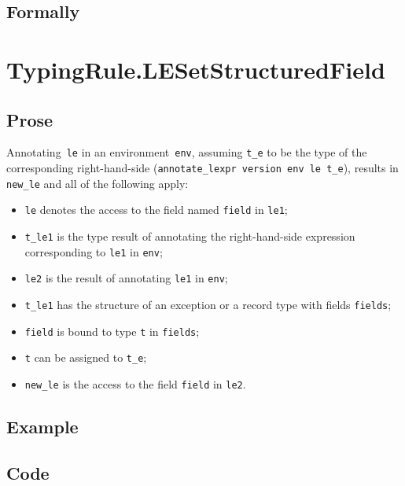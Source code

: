 \documentclass{book}
\begin{document}
\begin{emptyformal}
    \subsection{Formally}
\end{emptyformal}


\section{TypingRule.LESetStructuredField \label{sec:TypingRule.LESetStructuredField}}

    \subsection{Prose}
   Annotating~\texttt{le} in an environment~\texttt{env}, assuming
\texttt{t\_e} to be the type of the corresponding right-hand-side
(\texttt{annotate\_lexpr version env le t\_e}), results in \texttt{new\_le} and
all of the following apply:
   \begin{itemize}
   \item \texttt{le} denotes the access to the field named \texttt{field} in \texttt{le1};
   \item \texttt{t\_le1} is the type result of annotating the right-hand-side expression corresponding to \texttt{le1} in \texttt{env};
   \item \texttt{le2} is the result of annotating \texttt{le1} in \texttt{env};
   \item \texttt{t\_le1} has the structure of an exception or a record type with fields \texttt{fields};
   \item \texttt{field} is bound to type \texttt{t} in \texttt{fields};
   \item \texttt{t} can be assigned to \texttt{t\_e};
   \item \texttt{new\_le} is the access to the field \texttt{field} in \texttt{le2}.
   \end{itemize}

  \subsection{Example}

  \subsection{Code}
\end{document}
